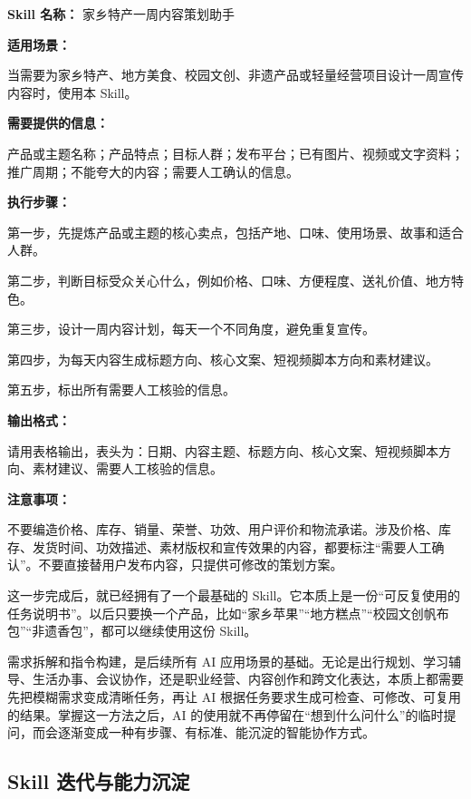 \begin{tcolorbox}[skillbox,title=家乡特产一周内容策划 Skill]
\textbf{Skill 名称：} 家乡特产一周内容策划助手

\textbf{适用场景：}

当需要为家乡特产、地方美食、校园文创、非遗产品或轻量经营项目设计一周宣传内容时，使用本 Skill。

\textbf{需要提供的信息：}

产品或主题名称；产品特点；目标人群；发布平台；已有图片、视频或文字资料；推广周期；不能夸大的内容；需要人工确认的信息。

\textbf{执行步骤：}

第一步，先提炼产品或主题的核心卖点，包括产地、口味、使用场景、故事和适合人群。

第二步，判断目标受众关心什么，例如价格、口味、方便程度、送礼价值、地方特色。

第三步，设计一周内容计划，每天一个不同角度，避免重复宣传。

第四步，为每天内容生成标题方向、核心文案、短视频脚本方向和素材建议。

第五步，标出所有需要人工核验的信息。

\textbf{输出格式：}

请用表格输出，表头为：日期、内容主题、标题方向、核心文案、短视频脚本方向、素材建议、需要人工核验的信息。

\textbf{注意事项：}

不要编造价格、库存、销量、荣誉、功效、用户评价和物流承诺。涉及价格、库存、发货时间、功效描述、素材版权和宣传效果的内容，都要标注“需要人工确认”。不要直接替用户发布内容，只提供可修改的策划方案。
\end{tcolorbox}

这一步完成后，就已经拥有了一个最基础的 Skill。它本质上是一份“可反复使用的任务说明书”。以后只要换一个产品，比如“家乡苹果”“地方糕点”“校园文创帆布包”“非遗香包”，都可以继续使用这份 Skill。

需求拆解和指令构建，是后续所有 AI 应用场景的基础。无论是出行规划、学习辅导、生活办事、会议协作，还是职业经营、内容创作和跨文化表达，本质上都需要先把模糊需求变成清晰任务，再让 AI 根据任务要求生成可检查、可修改、可复用的结果。掌握这一方法之后，AI 的使用就不再停留在“想到什么问什么”的临时提问，而会逐渐变成一种有步骤、有标准、能沉淀的智能协作方式。

\subsection{Skill 迭代与能力沉淀}

